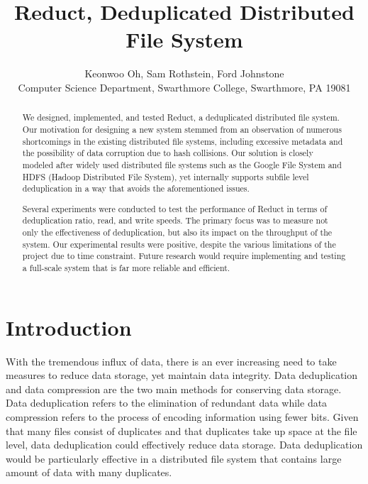 \documentclass[11pt,twocolumn]{article}
\begin{document}
\title{Reduct, Deduplicated Distributed File System}

\author{Keonwoo Oh, Sam Rothstein, Ford Johnstone \\
Computer Science Department, Swarthmore College, Swarthmore, PA  19081}

\maketitle

\begin{abstract}

We designed, implemented, and tested Reduct, a deduplicated distributed file system. Our motivation for designing a new system stemmed from an observation of numerous shortcomings in the existing distributed file systems, including excessive metadata and the possibility of data corruption due to hash collisions. Our solution is closely modeled after widely used distributed file systems such as the Google File System and HDFS (Hadoop Distributed File System), yet internally supports subfile level deduplication in a way that avoids the aforementioned issues. 

Several experiments were conducted to test the performance of Reduct in terms of deduplication ratio, read, and write speeds. The primary focus was to measure not only the effectiveness of deduplication, but also its impact on the throughput of the system. Our experimental results were positive, despite the various limitations of the project due to time constraint. Future research would require implementing and testing a full-scale system that is far more reliable and efficient. 
\end{abstract}


\section {Introduction} 

With the tremendous influx of data, there is an ever increasing need to take measures to reduce data storage, yet maintain data integrity. Data deduplication and data compression are the two main methods for conserving data storage. Data deduplication refers to the elimination of redundant data while data compression refers to the process of encoding information using fewer bits\cite{Overview}. Given that many files consist of duplicates and that duplicates take up space at the file level, data deduplication could effectively reduce data storage. Data deduplication would be particularly effective in a distributed file system that contains large amount of data with many duplicates\cite{Overview}.
\end{document}
